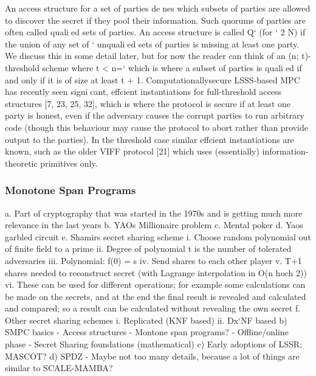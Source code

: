 \documentclass[english,runningheads,a4paper]{llncs}[2018/03/10]
\begin{document}
An access structure for a set of parties denes which subsets of parties are
allowed to discover the secret if they pool their information. Such quorums of
parties are often called qualied sets of parties. An access structure is called Q`
(for ` 2 N) if the union of any set of ` unqualied sets of parties is missing at
least one party. We discuss this in some detail later, but for now the reader can
think of an (n; t)-threshold scheme where t < n=` which is where a subset of
parties is qualied if and only if it is of size at least t + 1. Computationallysecure
LSSS-based MPC has recently seen signicant, effcient instantiations
for full-threshold access structures [7, 23, 25, 32], which is where the protocol is
secure if at least one party is honest, even if the adversary causes the corrupt
parties to run arbitrary code (though this behaviour may cause the protocol to
abort rather than provide output to the parties). In the threshold case similar
effcient instantiations are known, such as the older VIFF protocol [21] which
uses (essentially) information-theoretic primitives only.


\subsubsection{Monotone Span Programs}







a.	Part of cryptography that was started in the 1970s and is getting much more relevance in the last years
b.	YAOs Millionaire problem
c.	Mental poker
d.	Yaos garbled circuit
e.	Shamirs secret sharing scheme
i.	Choose random polynomial out of finite field to a prime
ii.	Degree of polynomial t is the number of tolerated adversaries
iii.	Polynomial: f(0) = s
iv.	Send shares to each other player
v.	 T+1 shares needed to reconstruct secret (with Lagrange interpolation in O(n hoch 2))
vi.	These can be used for different operations; for example some calculations can be made on the secrets, and at the end the final result is revealed and calculated and compared; so a result can be calculated without revealing the own secret
f.	Other secret sharing schemes
i.	Replicated (KNF based)
ii.	Dx`NF based
b)	SMPC basics
-	Access structures
-	Montone span programs?
-	Offline/online phase
-	Secret Sharing foundations (mathematical)
c)	Early adoptions of LSSR; MASCOT?
d)	SPDZ
-	Maybe not too many details, because a lot of things are similar to SCALE-MAMBA?
\end{document}
